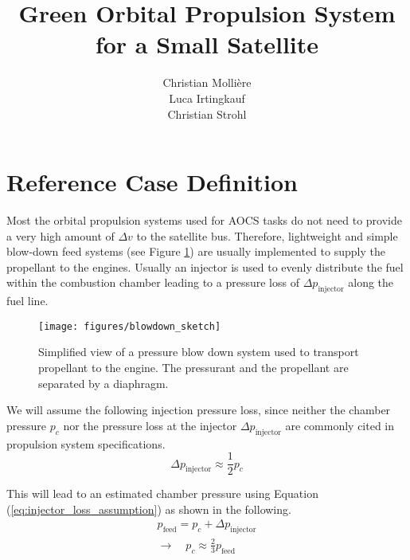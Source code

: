 \documentclass[12pt]{article}
\begin{document}
 
 
\title{Green Orbital Propulsion System for a Small Satellite}
\author{Christian Molli\`ere\\Luca Irtingkauf\\Christian Strohl}
\maketitle
\newpage

\section{Reference Case Definition}
\label{chap:reference_case}
Most the orbital propulsion systems used for AOCS tasks do not need to provide a very high amount of $\Delta v$ to the satellite bus. Therefore, lightweight and simple blow-down feed systems (see Figure \ref{fig:blowdown_system}) are usually implemented to supply the propellant to the engines. Usually an injector is used to evenly distribute the fuel within the combustion chamber leading to a pressure loss of $\Delta p_{\text{injector}}$ along the fuel line.\\

\begin{figure}[!h]
	\centering
	\texttt{[image: figures/blowdown\_sketch]}
	\caption{Simplified view of a pressure blow down system used to transport propellant to the engine. The pressurant and the propellant are separated by a diaphragm.}
	\label{fig:blowdown_system}
\end{figure}

We will assume the following injection pressure loss, since neither the chamber pressure $p_c$ nor the pressure loss at the injector $\Delta p_{\text{injector}}$ are commonly cited in propulsion system specifications.
\begin{equation}
	\Delta p_{\text{injector}} \approx \frac{1}{2}p_c 
	\label{eq:injector_loss_assumption}
\end{equation}

This will lead to an estimated chamber pressure using Equation (\ref{eq:injector_loss_assumption}) as shown in the following.
\begin{gather}
	p_{\text{feed}} = p_c + \Delta p_{\text{injector}} \\
	\rightarrow \quad p_c \approx \frac{2}{3} p_{\text{feed}}
	\label{eq:chamber_pressure_estimation}
\end{gather}
\end{document}

